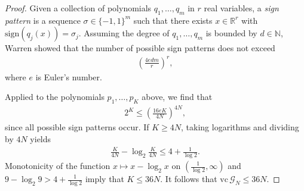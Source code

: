 \documentclass[11pt]{amsart}
\newcommand{\vc}{\mathrm{vc}}
\begin{document}
\begin{proof}
    Given a collection of polynomials $q_1,\ldots,q_m$ in $r$ real variables, a \emph{sign pattern} is a sequence $\sigma \in \{-1,1\}^m$ such that there exists $x \in \mathbb R^r$ with $\mathrm{sign}(q_j(x)) = \sigma_j$. Assuming the degree of $q_1,\ldots,q_m$ is bounded by $d \in \mathbb N$, Warren showed \cite[Theorem 3]{Warren1968} that the number of possible sign patterns does not exceed 
    \begin{align*}
        \left( \frac{4e d m}{r} \right)^r,
    \end{align*}
    where $e$ is Euler's number.

 Applied to the polynomials $p_{1},\ldots,p_{K}$ above, we find that 
    \begin{align*}
        2^K \leq \left( \frac{16e K}{4N} \right)^{4N},
    \end{align*}
    since all possible sign patterns occur. If $K \geq 4N$, taking logarithms and dividing by $4N$ yields
    \begin{align*}
        \frac K {4N} - \log_2 \frac K {4N} \leq 4 + \frac 1{\log 2}.
    \end{align*}
	Monotonicity of the function $x \mapsto x - \log_2 x$ on $(\frac1{\log 2},\infty)$ and $9 - \log_2 9 > 4 + \frac1{\log 2}$ imply that $K \leq 36N$. It follows that $\vc\, \mathcal G_{N} \leq 36 N$.
\end{proof}
\end{document}
